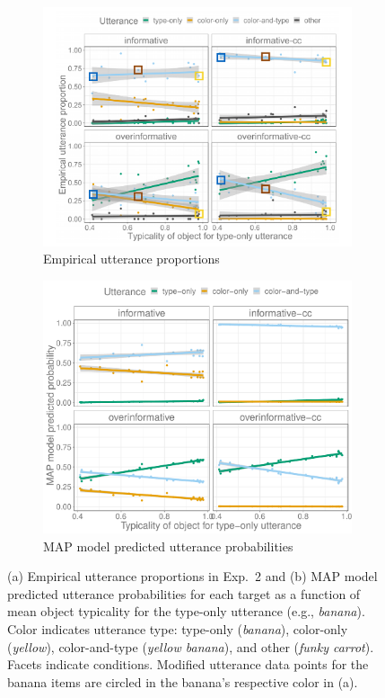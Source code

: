 \documentclass[11pt]{article}
\begin{document}
\begin{figure}
\centering
	\begin{subfigure}{.85\textwidth}
		\centering
		\includegraphics[width=.8\textwidth]{pics/empiricalProportions_typ.pdf}
		\caption{Empirical utterance proportions}
		\label{fig:exp2empirical}
	\end{subfigure}
	
	\begin{subfigure}{.85\textwidth}
		\centering
		\includegraphics[width=.77\textwidth]{pics/exp2-none-fixedplusempirical-predictives}
		\caption{MAP model predicted utterance probabilities}
		\label{fig:exp2model}
	\end{subfigure}
\caption{(a) Empirical utterance proportions in Exp.~2 and (b) MAP model predicted utterance probabilities for each target as a function of mean object typicality for the type-only utterance (e.g., \emph{banana}). Color indicates utterance type: type-only (\emph{banana}), color-only (\emph{yellow}), color-and-type (\emph{yellow banana}), and other (\emph{funky carrot}). Facets indicate conditions. Modified utterance data points for the banana items are circled in the banana's respective color in (a).}
\label{fig:exp2results}
\end{figure}
\end{document}

